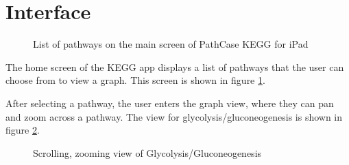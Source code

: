 \section{Interface}
\label{sect:kegg_interface}

\begin{figure}
    \caption{\label{fig:kegg_screenshot_list} List of pathways on the main screen
    of PathCase KEGG for iPad}
\end{figure}

The home screen of the KEGG app displays a list of pathways that the user can
choose from to view a graph. This screen is shown in figure
\ref{fig:kegg_screenshot_list}.

After selecting a pathway, the user enters the graph view, where they can pan
and zoom across a pathway. The view for glycolysis/gluconeogenesis is shown in
figure \ref{fig:kegg_screenshot_pathway}.

\begin{figure}[hbt]
    \caption{\label{fig:kegg_screenshot_pathway} Scrolling,
    zooming view of Glycolysis/Gluconeogenesis}
\end{figure}

